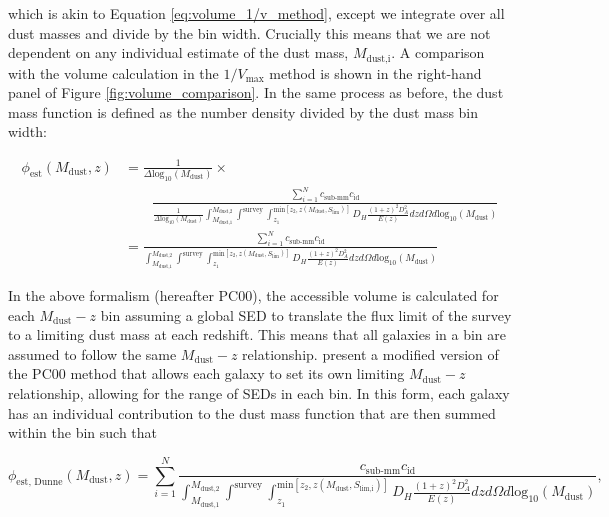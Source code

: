 \noindent which is akin to Equation \ref{eq:volume_1/v_method}, except we integrate over all dust masses and divide by the bin width. Crucially this means that we are not dependent on any individual estimate of the dust mass, $M_{\textrm{dust,i}}$. A comparison with the volume calculation in the $1/V_{\textrm{max}}$ method is shown in the right-hand panel of Figure \ref{fig:volume_comparison}. In the same process as before, the dust mass function is defined as the number density divided by the dust mass bin width:

\begin{align}
    \phi_{\textrm{est}}(M_{\textrm{dust}},z) &= \frac{1}{\Delta \textrm{log}_{10}(M_{\textrm{dust}})} \times \nonumber \\
    & \qquad \frac{\sum_{i=1}^N c_{\scriptscriptstyle \textrm{sub-mm}} c_{\scriptscriptstyle \textrm{id}}}{\frac{1}{\Delta \textrm{log}_{10}(M_\textrm{dust})}\int_{\scriptscriptstyle M_{\textrm{dust,1}}}^{\scriptscriptstyle M_{\textrm{dust,2}}} \int^{\scriptscriptstyle \textrm{survey}} \int_{\scriptscriptstyle z_1}^{\scriptscriptstyle \textrm{min}[z_2, z(M_{\textrm{dust}},S_{\textrm{lim}})]} D_H \frac{(1+z)^2 D_A^2}{E(z)} dz d\Omega d\textrm{log}_{10}(M_\textrm{dust})} \nonumber \\
    &= \frac{\sum_{i=1}^N c_{\scriptscriptstyle \textrm{sub-mm}} c_{\scriptscriptstyle \textrm{id}}}{\int_{\scriptscriptstyle M_{\textrm{dust,1}}}^{\scriptscriptstyle M_{\textrm{dust,2}}} \int^{\scriptscriptstyle \textrm{survey}} \int_{\scriptscriptstyle z_1}^{\scriptscriptstyle \textrm{min}[z_2, z(M_{\textrm{dust}},S_{\textrm{lim}})]} D_H \frac{(1+z)^2 D_A^2}{E(z)} dz d\Omega d\textrm{log}_{10}(M_\textrm{dust})}
\label{eq:phi_pc00_method}
\end{align}

In the above formalism (hereafter PC00), the accessible volume is calculated for each $M_{\textrm{dust}} - z$ bin assuming a global SED to translate the flux limit of the survey to a limiting dust mass at each redshift. This means that all galaxies in a bin are assumed to follow the same $M_{\textrm{dust}} - z$ relationship. \citealt{Dunne_2011} present a modified version of the PC00 method that allows each galaxy to set its own limiting $M_{\textrm{dust}} - z$ relationship, allowing for the range of SEDs in each bin. In this form, each galaxy has an individual contribution to the dust mass function that are then summed within the bin such that

\begin{equation}
    \phi_{\textrm{est, Dunne}}(M_{\textrm{dust}},z) = \sum_{i=1}^N \frac{c_{\scriptscriptstyle \textrm{sub-mm}} c_{\scriptscriptstyle \textrm{id}}}{\int_{\scriptscriptstyle M_{\textrm{dust,1}}}^{\scriptscriptstyle M_{\textrm{dust,2}}} \int^{\scriptscriptstyle \textrm{survey}} \int_{\scriptscriptstyle z_1}^{\scriptscriptstyle \textrm{min}[z_2, z(M_{\textrm{dust}},S_{\textrm{lim,i}})]} D_H \frac{(1+z)^2 D_A^2}{E(z)} dz d\Omega d\textrm{log}_{10}(M_\textrm{dust})},
\label{eq:phi_pc00_dunne_method}
\end{equation}


